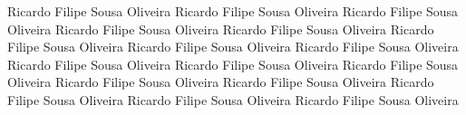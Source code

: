 \documentclass[11pt,a4paper]{article}
\theoremstyle{plain}
\theoremstyle{definition}
\theoremstyle{remark}
\begin{document}

%




%

%

%

%

Ricardo Filipe Sousa Oliveira Ricardo Filipe Sousa Oliveira Ricardo Filipe Sousa Oliveira Ricardo Filipe Sousa Oliveira Ricardo Filipe Sousa Oliveira Ricardo Filipe Sousa Oliveira Ricardo Filipe Sousa Oliveira Ricardo Filipe Sousa Oliveira Ricardo Filipe Sousa Oliveira Ricardo Filipe Sousa Oliveira Ricardo Filipe Sousa Oliveira Ricardo Filipe Sousa Oliveira Ricardo Filipe Sousa Oliveira Ricardo Filipe Sousa Oliveira Ricardo Filipe Sousa Oliveira Ricardo Filipe Sousa Oliveira 
\end{document}
